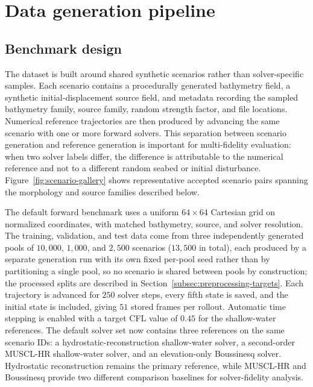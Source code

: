 \section{Data generation pipeline}
\label{sec:data-generation}

\subsection{Benchmark design}
\label{subsec:benchmark-design}

The dataset is built around shared synthetic scenarios rather than solver-specific samples. Each scenario contains a procedurally generated bathymetry field, a synthetic initial-displacement source field, and metadata recording the sampled bathymetry family, source family, random strength factor, and file locations. Numerical reference trajectories are then produced by advancing the same scenario with one or more forward solvers. This separation between scenario generation and reference generation is important for multi-fidelity evaluation: when two solver labels differ, the difference is attributable to the numerical reference and not to a different random seabed or initial disturbance. Figure~\ref{fig:scenario-gallery} shows representative accepted scenario pairs spanning the morphology and source families described below.

The default forward benchmark uses a uniform $64 \times 64$ Cartesian grid on normalized coordinates, with matched bathymetry, source, and solver resolution. The training, validation, and test data come from three independently generated pools of $10{,}000$, $1{,}000$, and $2{,}500$ scenarios ($13{,}500$ in total), each produced by a separate generation run with its own fixed per-pool seed rather than by partitioning a single pool, so no scenario is shared between pools by construction; the processed splits are described in Section~\ref{subsec:preprocessing-targets}. Each trajectory is advanced for $250$ solver steps, every fifth state is saved, and the initial state is included, giving $51$ stored frames per rollout. Automatic time stepping is enabled with a target CFL value of $0.45$ for the shallow-water references. The default solver set now contains three references on the same scenario IDs: a hydrostatic-reconstruction shallow-water solver, a second-order MUSCL-HR shallow-water solver, and an elevation-only Boussinesq solver. Hydrostatic reconstruction remains the primary reference, while MUSCL-HR and Boussinesq provide two different comparison baselines for solver-fidelity analysis.

